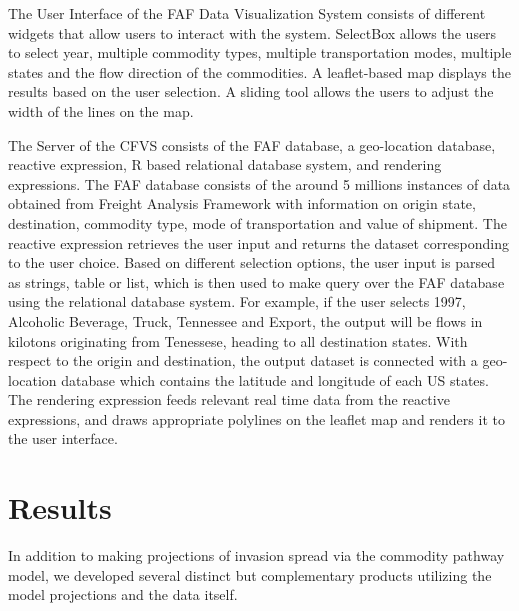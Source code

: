 \documentclass[12pt]{article}
\begin{document}
The User Interface of the FAF Data Visualization System consists of different widgets that allow users to interact with the system. SelectBox allows the users to select year, multiple commodity types, multiple transportation modes, multiple states and the flow direction of the commodities.  A leaflet-based map displays the results based on the user selection. A sliding tool allows the users to adjust the width of the lines on the map.  

The Server of the CFVS consists of the FAF database, a geo-location database, reactive expression, R based relational database system, and rendering expressions. The FAF database consists of the around 5 millions instances of data obtained from Freight Analysis Framework with information on origin state, destination, commodity type, mode of transportation and value of shipment. The reactive expression retrieves the user input and returns the dataset corresponding to the user choice. Based on different selection options, the user input is parsed as strings, table or list, which is then used to make query over the FAF database using the relational database system.  For example, if the user selects 1997, Alcoholic Beverage, Truck, Tennessee and Export, the output will be flows in kilotons originating from Tenessese, heading to all destination states. With respect to the origin and destination, the output dataset is connected with a geo-location database which contains the latitude and longitude of each US states.  The rendering expression feeds relevant real time data from the reactive expressions, and draws appropriate polylines on the leaflet map and renders it to the user interface.  

\section*{Results}

In addition to making projections of invasion spread via the commodity pathway model, we developed several distinct but complementary products utilizing the model projections and the data itself.
\end{document}
